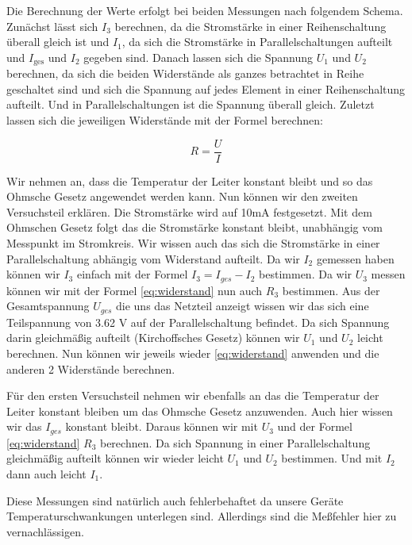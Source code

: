         Die Berechnung der Werte erfolgt bei beiden Messungen nach folgendem Schema. Zunächst lässt sich $I_{3}$ berechnen, da die Stromstärke in einer Reihenschaltung überall gleich ist und $I_{1}$, da sich die Stromstärke in Parallelschaltungen aufteilt und $I_{\mathrm{ges}}$ und $I_{2}$ gegeben sind.
        Danach lassen sich die Spannung $U_{1}$ und $U_{2}$ berechnen, da sich die beiden Widerstände als ganzes betrachtet in Reihe geschaltet sind und sich die Spannung auf jedes Element in einer Reihenschaltung aufteilt. Und in Parallelschaltungen ist die Spannung überall gleich.
        Zuletzt lassen sich die jeweiligen Widerstände mit der Formel berechnen:

        \begin{equation}
            R = \frac{U}{I}
            \label{eq:widerstand}
        \end{equation}

        Wir nehmen an, dass die Temperatur der Leiter konstant bleibt und so das Ohmsche Gesetz angewendet werden kann. Nun können wir den zweiten Versuchsteil erklären. Die Stromstärke wird auf 10mA festgesetzt. Mit dem Ohmschen Gesetz folgt das die Stromstärke konstant bleibt, unabhängig vom Messpunkt im Stromkreis. Wir wissen auch das sich die Stromstärke in einer Parallelschaltung abhängig vom Widerstand aufteilt. Da wir $I_2$ gemessen haben können wir $I_3$ einfach mit der Formel $I_3 = I_{ges} - I_2$ bestimmen. Da wir $U_3$ messen können wir mit der Formel \ref{eq:widerstand} nun auch $R_3$ bestimmen. Aus der Gesamtspannung $U_{ges}$ die uns das Netzteil anzeigt wissen wir das sich eine Teilspannung von 3.62 V auf der Parallelschaltung befindet. Da sich Spannung darin gleichmäßig aufteilt (Kirchoffsches Gesetz) können wir $U_1$ und $U_2$ leicht berechnen. Nun können wir jeweils wieder \ref{eq:widerstand} anwenden und die anderen 2 Widerstände berechnen.
        
        Für den ersten Versuchsteil nehmen wir ebenfalls an das die Temperatur der Leiter konstant bleiben um das Ohmsche Gesetz anzuwenden. Auch hier wissen wir das $I_{ges}$ konstant bleibt. Daraus können wir mit $U_3$ und der Formel \ref{eq:widerstand} $R_3$ berechnen. Da sich Spannung in einer Parallelschaltung gleichmäßig aufteilt können wir wieder leicht $U_1$ und $U_2$ bestimmen. Und mit $I_2$ dann auch leicht $I_1$. 
        
        Diese Messungen sind natürlich auch fehlerbehaftet da unsere Geräte Temperaturschwankungen unterlegen sind. Allerdings sind die Meßfehler hier zu vernachlässigen.

